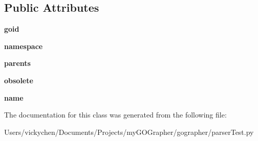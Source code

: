 \subsection*{Public Attributes}
\begin{DoxyCompactItemize}
\item 
\hypertarget{classparser_test_1_1_g_o_node_a0bf4142425670d0f07e39e5e8c8fa0b3}{
{\bfseries goid}}
\label{classparser_test_1_1_g_o_node_a0bf4142425670d0f07e39e5e8c8fa0b3}

\item 
\hypertarget{classparser_test_1_1_g_o_node_a4a2b10c58ae2ba39e803bb947c36894e}{
{\bfseries namespace}}
\label{classparser_test_1_1_g_o_node_a4a2b10c58ae2ba39e803bb947c36894e}

\item 
\hypertarget{classparser_test_1_1_g_o_node_ad6aeb446c627b2cbadcfcd87d1eeed2d}{
{\bfseries parents}}
\label{classparser_test_1_1_g_o_node_ad6aeb446c627b2cbadcfcd87d1eeed2d}

\item 
\hypertarget{classparser_test_1_1_g_o_node_a74e59b8bc01fea95819ba6c2f37ea20f}{
{\bfseries obsolete}}
\label{classparser_test_1_1_g_o_node_a74e59b8bc01fea95819ba6c2f37ea20f}

\item 
\hypertarget{classparser_test_1_1_g_o_node_a3fe236bd4b6747ea5422d62ba85ff7f1}{
{\bfseries name}}
\label{classparser_test_1_1_g_o_node_a3fe236bd4b6747ea5422d62ba85ff7f1}

\end{DoxyCompactItemize}


The documentation for this class was generated from the following file:\begin{DoxyCompactItemize}
\item 
Users/vickychen/Documents/Projects/myGOGrapher/gographer/parserTest.py\end{DoxyCompactItemize}
